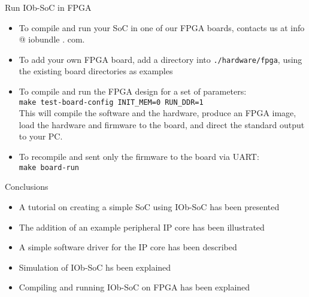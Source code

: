 \documentclass [xcolor=svgnames, t] {beamer}
\begin{document}
\begin{frame}{Run IOb-SoC in FPGA}
\begin{itemize}
\item To compile and run your SoC in one of our FPGA boards, contacts us at info
  @ iobundle . com.
\item To add your own FPGA board, add a directory into {\tt ./hardware/fpga},
  using the existing board directories as examples
\item To compile and run the FPGA design for a set of parameters:\\
  {\tt make test-board-config INIT\_MEM=0 RUN\_DDR=1}\\
  This will compile the software and the hardware, produce an FPGA image, load the hardware and firmware to the board, and direct the standard output to your PC.
\item To recompile and sent only the firmware to the board via UART:\\
  {\tt make board-run}
\end{itemize}
\end{frame}

\begin{frame}{Conclusions}  
  \begin{itemize}
  \item A tutorial on creating a simple SoC using IOb-SoC has been presented
  \item The addition of an example peripheral IP core has been illustrated
  \item A simple software driver for the IP core has been described
  \item Simulation of IOb-SoC hs been explained
  \item Compiling and running IOb-SoC on FPGA has been explained
  \end{itemize}
\end{frame}

\end{document}
